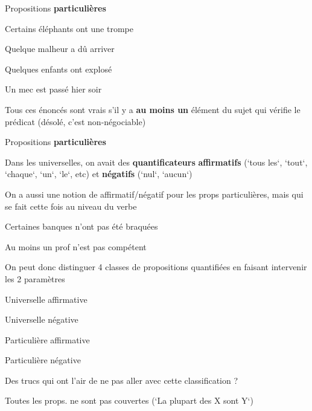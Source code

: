 \begin{frame}
	Propositions \textbf{particulières}
	
		\begin{description}[labelindent=6pt,style=multiline,leftmargin=1.3in]
		 \setlength\itemsep{1em}

\item[Remarque] Certains éléphants ont une trompe
\item[] Quelque malheur a dû arriver
\item[] Quelques enfants ont explosé
\item[] Un mec est passé hier soir\pause
\item[Attention] Tous ces énoncés sont vrais s'il y a \textbf{au moins un} élément du sujet qui vérifie le prédicat \pause (désolé, c'est non-négociable)
	\end{description}
\end{frame}


\begin{frame}
	Propositions \textbf{particulières}
	
		\begin{description}[labelindent=6pt,style=multiline,leftmargin=1.3in]
		 \setlength\itemsep{1em}
\item[Rappel] Dans les universelles, on avait des \textbf{quantificateurs} \textbf{affirmatifs} (`tous les`, `tout`, `chaque`, `un`, `le`, etc) et \textbf{négatifs} (`nul`, `aucun`)\pause
\item[Remarque] On a aussi une notion de affirmatif/négatif pour les props particulières\pause, mais qui se fait cette fois au niveau du verbe\pause
\item[Exemples] Certaines banques n'ont pas été braquées
\item[] Au moins un prof n'est pas compétent 
	\end{description}
\end{frame}


\begin{frame}
	On peut donc distinguer 4 classes de propositions quantifiées en faisant intervenir les 2 paramètres \pause
			\begin{description}[labelindent=6pt,style=multiline,leftmargin=1.3in]
		 \setlength\itemsep{1em}
\item[A] Universelle affirmative 
\item[E] Universelle négative
\item[I] Particulière affirmative 
\item[O] Particulière négative\pause
\item[Question] Des trucs qui ont l'air de ne pas aller avec cette classification ?\pause
\item[] Toutes les props. ne sont pas couvertes (`La plupart des X sont Y`)
	\end{description}
	
\end{frame}



